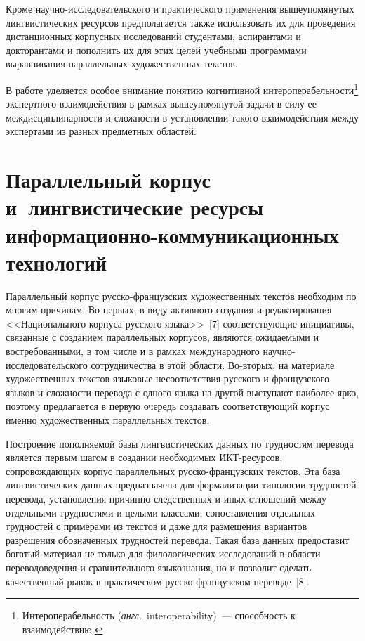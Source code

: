 \begin{multicols}{2}
     Кроме научно-исследовательского и практического применения 
вышеупомянутых лингвистических ресурсов предполагается также 
использовать их для проведения дистанционных корпусных исследований 
студентами, аспирантами и докторантами и пополнить их для этих целей 
учебными программами выравнивания параллельных художественных 
текстов.
     
     В работе уделяется особое внимание понятию когнитивной 
интероперабельности\footnote{Интероперабельность (\textit{англ}.\ 
{interoperability})~--- способность к взаимодействию.} экспертного 
взаимодействия в рамках вышеупомянутой задачи в силу ее 
междисциплинарности и сложности в установлении такого взаимодействия 
между экспертами из разных предметных областей. 

\section{Параллельный корпус и~лингвистические 
ресурсы информационно-коммуникационных технологий}
     
     Параллельный корпус рус\-ско-фран\-цуз\-ских художественных 
текстов необходим по многим причинам. Во-пер\-вых, в виду активного 
создания и редактирования <<Национального корпуса русского языка>>~[7] 
соответствующие инициативы, связанные с созданием параллельных 
корпусов, являются ожидаемыми и востребованными, в том числе и в рамках 
международного на\-уч\-но-ис\-сле\-до\-ва\-тель\-ско\-го сотрудничества в 
этой области. Во-вто\-рых, на материале художественных текстов языковые 
несоответствия русского и французского языков и сложности перевода с 
одного языка на другой выступают наиболее ярко, поэтому предлагается в 
первую очередь создавать соответствующий корпус именно художественных 
параллельных текстов.
     
     Построение пополняемой базы лингвистических данных по трудностям 
перевода является первым шагом в создании необходимых ИКТ-ре\-сур\-сов, 
сопровождающих корпус параллельных русско-фран\-цуз\-ских текстов. 
Эта база лингвистических данных предназначена для формализации 
типологии трудностей перевода, установления 
     при\-чин\-но-след\-ст\-вен\-ных и иных отношений между отдельными 
трудностями и целыми классами, сопоставления отдельных трудностей с 
примерами из текстов и даже для размещения вариантов разрешения 
обозначенных трудностей перевода. Такая база данных предоставит богатый 
материал не только для филологических исследований в области 
переводоведения и сравнительного языкознания, но и позволит сделать 
качественный рывок в практическом рус\-ско-фран\-цуз\-ском переводе~[8].
     

\end{multicols}
